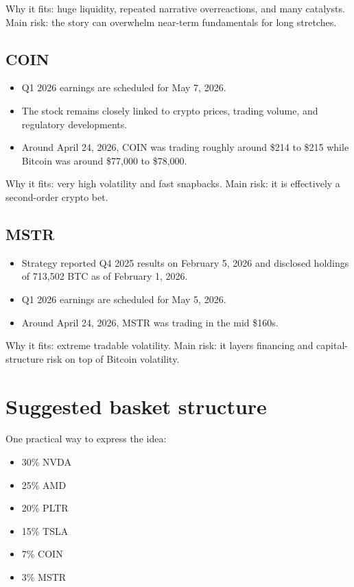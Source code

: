 \documentclass[11pt]{article}
\begin{document}
Why it fits: huge liquidity, repeated narrative overreactions, and many catalysts. Main risk: the story can overwhelm near-term fundamentals for long stretches.

\subsection*{COIN}

\begin{itemize}
  \item Q1 2026 earnings are scheduled for May 7, 2026.
  \item The stock remains closely linked to crypto prices, trading volume, and regulatory developments.
  \item Around April 24, 2026, COIN was trading roughly around \$214 to \$215 while Bitcoin was around \$77,000 to \$78,000.
\end{itemize}

Why it fits: very high volatility and fast snapbacks. Main risk: it is effectively a second-order crypto bet.

\subsection*{MSTR}

\begin{itemize}
  \item Strategy reported Q4 2025 results on February 5, 2026 and disclosed holdings of 713,502 BTC as of February 1, 2026.
  \item Q1 2026 earnings are scheduled for May 5, 2026.
  \item Around April 24, 2026, MSTR was trading in the mid \$160s.
\end{itemize}

Why it fits: extreme tradable volatility. Main risk: it layers financing and capital-structure risk on top of Bitcoin volatility.

\section*{Suggested basket structure}

One practical way to express the idea:

\begin{itemize}
  \item 30\% NVDA
  \item 25\% AMD
  \item 20\% PLTR
  \item 15\% TSLA
  \item 7\% COIN
  \item 3\% MSTR
\end{itemize}
\end{document}
